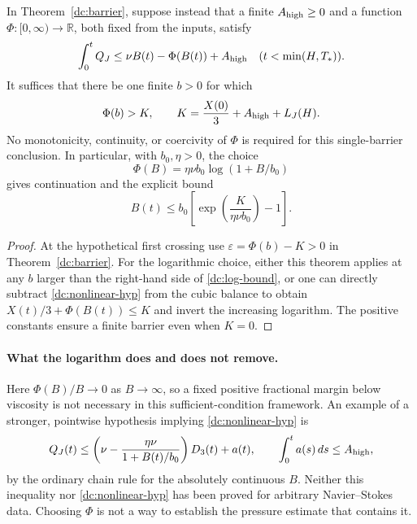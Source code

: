 \begin{corollary}
\label{dc:nonlinear}
In Theorem~\ref{dc:barrier}, suppose instead that a finite $A_{\rm high}\ge0$
and a function $\Phi:[0,\infty)\to\mathbb R$, both fixed from the inputs,
satisfy
\begin{equation}\label{dc:nonlinear-hyp}
 \int_0^tQ_J\le\nu B(t)-\Phi(B(t))+A_{\rm high}
 \quad(t<\min(H,T_*)).
\end{equation}
It suffices that there be one finite $b>0$ for which
\begin{equation}\label{dc:barrier-value}
 \Phi(b)>K,\qquad K=\frac{X(0)}3+A_{\rm high}+L_J(H).
\end{equation}
No monotonicity, continuity, or coercivity of $\Phi$ is required for this
single-barrier conclusion.  In particular, with $b_0,\eta>0$, the choice
\begin{equation}\label{dc:log-deficit}
 \Phi(B)=\eta\nu b_0\log(1+B/b_0)
\end{equation}
gives continuation and the explicit bound
\begin{equation}\label{dc:log-bound}
 B(t)\le b_0\left[\exp\!\left(\frac{K}{\eta\nu b_0}\right)-1\right].
\end{equation}
\end{corollary}
\begin{proof}
At the hypothetical first crossing use
$\varepsilon=\Phi(b)-K>0$ in Theorem~\ref{dc:barrier}.
For the logarithmic choice, either this theorem applies at any $b$ larger
than the right-hand side of \eqref{dc:log-bound}, or one can directly
subtract \eqref{dc:nonlinear-hyp} from the cubic balance to obtain
$X(t)/3+\Phi(B(t))\le K$ and invert the increasing logarithm.
The positive constants ensure a finite barrier even when $K=0$.
\end{proof}

\paragraph{What the logarithm does and does not remove.}
Here $\Phi(B)/B\to0$ as $B\to\infty$, so a fixed positive fractional
margin below viscosity is not necessary in this sufficient-condition
framework.  An example of a stronger, pointwise hypothesis implying
\eqref{dc:nonlinear-hyp} is
\[
 Q_J(t)\le\left(\nu-\frac{\eta\nu}{1+B(t)/b_0}\right)D_3(t)+a(t),
 \qquad \int_0^t a(s)\,ds\le A_{\rm high},
\]
by the ordinary chain rule for the absolutely continuous $B$.  Neither
this inequality nor \eqref{dc:nonlinear-hyp} has been proved for arbitrary
Navier--Stokes data.  Choosing $\Phi$ is not a way to establish the
pressure estimate that contains it.

